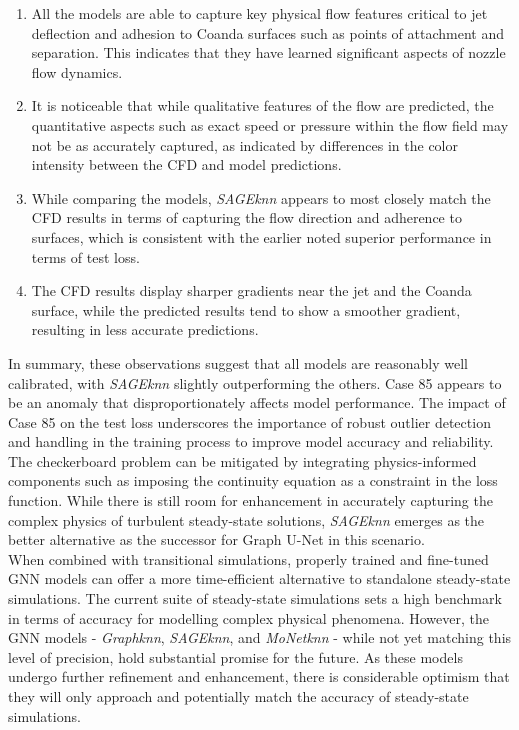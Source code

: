 \begin{enumerate}
    \item All the models are able to capture key physical flow features critical to jet deflection and adhesion to Coanda surfaces such as points of attachment and separation. This indicates that they have learned significant aspects of nozzle flow dynamics.
    \item It is noticeable that while qualitative features of the flow are predicted, the quantitative aspects such as exact speed or pressure within the flow field may not be as accurately captured, as indicated by differences in the color intensity between the CFD and model predictions.
    \item While comparing the models, \textit{SAGEknn} appears to most closely match the CFD results in terms of capturing the flow direction and adherence to surfaces, which is consistent with the earlier noted superior performance in terms of test loss.
    \item The CFD results display sharper gradients near the jet and the Coanda surface, while the predicted results tend to show a smoother gradient, resulting in less accurate predictions.
\end{enumerate}
In summary, these observations suggest that all models are reasonably well calibrated, with \textit{SAGEknn} slightly outperforming the others. Case 85 appears to be an anomaly that disproportionately affects model performance. The impact of Case 85 on the test loss underscores the importance of robust outlier detection and handling in the training process to improve model accuracy and reliability. The checkerboard problem can be mitigated by integrating physics-informed components such as imposing the continuity equation as a constraint in the loss function. While there is still room for enhancement in accurately capturing the complex physics of turbulent steady-state solutions, \textit{SAGEknn} emerges as the better alternative as the successor for Graph U-Net in this scenario. \\
When combined with transitional simulations, properly trained and fine-tuned GNN models can offer a more time-efficient alternative to standalone steady-state simulations. The current suite of steady-state simulations sets a high benchmark in terms of accuracy for modelling complex physical phenomena. However, the GNN models - \textit{Graphknn}, \textit{SAGEknn}, and \textit{MoNetknn} - while not yet matching this level of precision, hold substantial promise for the future. As these models undergo further refinement and enhancement, there is considerable optimism that they will only approach and potentially match the accuracy of steady-state simulations.\\

